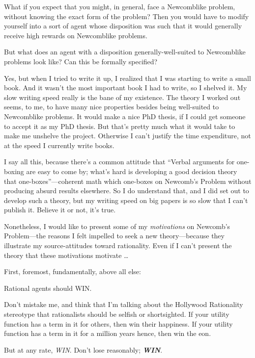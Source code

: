 {
 What if you expect that you might, in general, face a Newcomblike
problem, without knowing the exact form of the problem? Then you would
have to modify yourself into a sort of agent whose disposition was such
that it would generally receive high rewards on Newcomblike problems.}

{
 But what does an agent with a disposition generally-well-suited to
Newcomblike problems look like? Can this be formally specified?}

{
 Yes, but when I tried to write it up, I realized that I was
starting to write a small book. And it wasn't the most
important book I had to write, so I shelved it. My slow writing speed
really is the bane of my existence. The theory I worked out seems, to
me, to have many nice properties besides being well-suited to
Newcomblike problems. It would make a nice PhD thesis, if I could get
someone to accept it as my PhD thesis. But that's
pretty much what it would take to make me unshelve the project.
Otherwise I can't justify the time expenditure, not at
the speed I currently write books.}

{
 I say all this, because there's a common attitude
that ``Verbal arguments for one-boxing are easy to
come by; what's hard is developing a good decision
theory that one-boxes''---coherent math which
one-boxes on Newcomb's Problem without producing absurd
results elsewhere. So I do understand that, and I did set out to
develop such a theory, but my writing speed on big papers is so slow
that I can't publish it. Believe it or not,
it's true.}

{
 Nonetheless, I would like to present some of my
\textit{motivations} on Newcomb's Problem---the reasons
I felt impelled to seek a new theory---because they illustrate my
source-attitudes toward rationality. Even if I can't
present the theory that these motivations motivate \ldots}

{
 First, foremost, fundamentally, above all else:}

{
 Rational agents should WIN.}

{
 Don't mistake me, and think that
I'm talking about the Hollywood Rationality stereotype
that rationalists should be selfish or shortsighted. If your utility
function has a term in it for others, then win their happiness. If your
utility function has a term in it for a million years hence, then win
the eon.}

{
 But at any rate, \textit{WIN}. Don't lose
reasonably; \textbf{\textit{WIN}}.}

